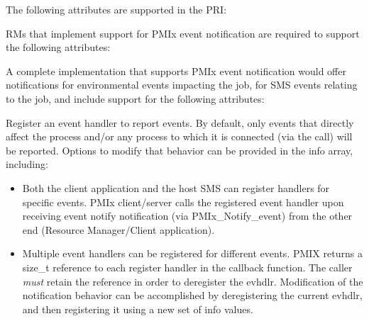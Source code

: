 \priattr
The following attributes are supported in the \ac{PRI}:


\reqattr
\acp{RM} that implement support for PMIx event notification are required to support the following attributes:


\optattr
A complete implementation that supports \ac{PMIx} event notification would offer notifications for environmental events impacting the job, for \ac{SMS} events relating to the job, and include support for the following attributes:



\descr

Register an event handler to report events. By default, only events that directly affect the process and/or any process to which it is connected (via the  call) will be reported. Options to modify that behavior can be provided in the info array, including:

\begin{itemize}

\item Both the client application and the host \ac{SMS} can register handlers for specific events. \ac{PMIx} client/server calls the registered event handler upon receiving event notify notification (via PMIx_Notify_event) from the other end (Resource Manager/Client application).

\item Multiple event handlers can be registered for different events. PMIX returns a size_t reference to each register handler in the callback function. The caller \textit{must} retain the reference in order to deregister the evhdlr. Modification of the notification behavior can be accomplished by deregistering the current evhdlr, and then registering it using a new set of info values.
\end{itemize}

